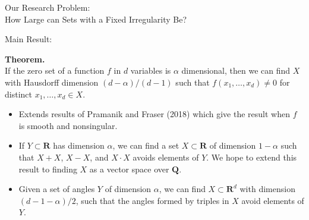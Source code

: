 \documentclass[final]{beamer}
\newlength{\twocolwid}
\begin{document}
\begin{frame}[t]
\begin{columns}[t]
\begin{column}{\twocolwid}
\begin{alertblock}{Our Research Problem:\\How Large can Sets with a Fixed Irregularity Be?}
\begin{itemize}
\end{itemize}

\end{alertblock}

\begin{alertblock}{Main Result:\\
}


\hspace{0.2cm}

\begin{center}
{\bf Theorem.}\\
If the zero set of a function $f$ in $d$ variables is $\alpha$ dimensional, then we can find $X$ with Hausdorff dimension $(d - \alpha)/(d-1)$ such that $f(x_1, \dots, x_d) \neq 0$ for distinct $x_1, \dots, x_d \in X$.
\end{center}

\begin{itemize}
	\item Extends results of Pramanik and Fraser (2018) which give the result when $f$ is smooth and nonsingular.

	\item If $Y \subset \mathbf{R}$ has dimension $\alpha$, we can find a set $X \subset \mathbf{R}$ of dimension $1 - \alpha$ such that $X + X$, $X - X$, and $X \cdot X$ avoids elements of $Y$. We hope to extend this result to finding $X$ as a vector space over $\mathbf{Q}$.

	\item Given a set of angles $Y$ of dimension $\alpha$, we can find $X \subset \mathbf{R}^d$ with dimension $(d-1-\alpha)/2$, such that the angles formed by triples in $X$ avoid elements of $Y$.
\end{itemize}

\end{alertblock} 

\begin{figure}
\end{figure}
\end{column}
\end{columns}
\end{frame}
\end{document}

